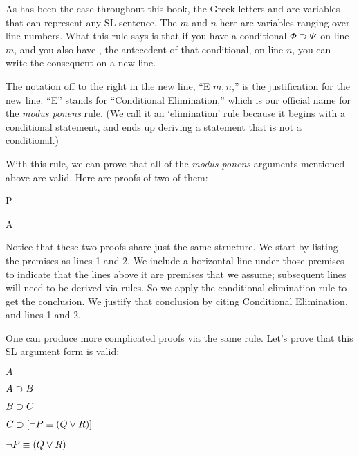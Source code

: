 \begin{ndproof}
	\metaA{}
	\metaB{} 
\end{ndproof}

As has been the case throughout this book, the Greek letters \metaA{} and \metaB{} are variables that can represent any SL sentence. The $m$ and $n$ here are variables ranging over line numbers. What this rule says is that if you have a conditional $\varPhi{}\supset\varPsi{}$ on line $m$, and you also have \metaA{}, the antecedent of that conditional, on line $n$, you can write the consequent \metaB{} on a new line.

The notation off to the right in the new line, ``\eif E $m, n$,'' is the justification for the new line. ``\eif E'' stands for ``Conditional Elimination,'' which is our official name for the \emph{modus ponens} rule. (We call it an `elimination' rule because it begins with a conditional statement, and ends up deriving a statement that is not a conditional.)

With this rule, we can prove that all of the \emph{modus ponens} arguments mentioned above are valid. Here are proofs of two of them:


\begin{multicols}{2}

\begin{ndproof}
	P
	 
\end{ndproof}


\begin{ndproof}
	A 
\end{ndproof}

\end{multicols}

Notice that these two proofs share just the same structure. We start by listing the premises as lines 1 and 2. We include a horizontal line under those premises to indicate that the lines above it are premises that we assume; subsequent lines will need to be derived via rules. So we apply the conditional elimination rule to get the conclusion. We justify that conclusion by citing Conditional Elimination, and lines 1 and 2.

One can produce more complicated proofs via the same rule. Let's prove that this SL argument form is valid:

\begin{earg}

\item[] $A$
\item[] $A \supset B$
\item[] $B \supset C$
\item[] $C \supset [\neg P \equiv (Q \vee R)]$
\item[\therefore] $\neg P \equiv (Q \vee R)$
\end{earg}

